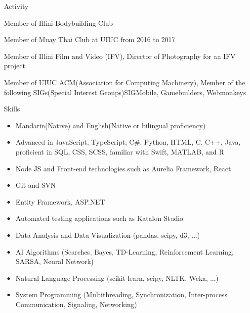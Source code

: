 \documentclass{resume}
\begin{document}
\bigbreak

\begin{rSection}{Activity} \itemsep -3pt

    \item Member of Illini Bodybuilding Club
    \item Member of Muay Thai Club at UIUC from 2016 to 2017
    \item Member of Illini Film and Video (IFV), Director of Photography for an IFV project
    \item Member of UIUC ACM(Association for Computing Machinery), Member of the following SIGs(Special Interest Groups)\colon SIGMobile, Gamebuilders, Webmonkeys

\end{rSection}

\begin{rSection}{Skills}

\begin{itemize}

    \item   Mandarin(Native) and English(Native or bilingual proficiency)
    \item	Advanced in JavaScript, TypeScript, C\#, Python, HTML, C, C++, Java, proficient in SQL, CSS, SCSS, familiar with Swift, MATLAB, and R
    \item	Node JS and Front-end technologies such as Aurelia Framework, React
    \item   Git and SVN
    \item	Entity Framework, ASP.NET
    \item	Automated testing applications such as Katalon Studio	
    \item   Data Analysis and Data Visualization (pandas, scipy, d3, ...)
    \item	AI Algorithms (Searches, Bayes, TD-Learning, Reinforcement Learning, SARSA, Neural Network)
    \item	Natural Language Processing (scikit-learn, scipy, NLTK, Weka, ...)
    \item	System Programming (Multithreading, Synchronization, Inter-process Communication, Signaling, Networking)

\end{itemize}

\end{rSection}
\end{document}
